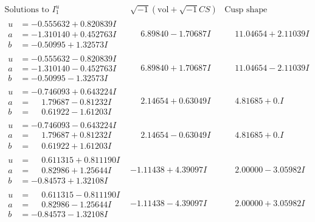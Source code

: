 \documentclass[1p]{elsarticle_modified}
\theoremstyle{definition}
\newcommand{\I}{\sqrt{-1}}
\begin{document}
$$\begin{array}{c|c|c}  
\text{Solutions to }I^u_{1}& \I (\text{vol} + \sqrt{-1}CS) & \text{Cusp shape}\\
 \hline 
\begin{aligned}
u &= -0.555632 + 0.820839 I \\
a &= -1.310140 + 0.452763 I \\
b &= -0.50995 + 1.32573 I\end{aligned}
 & \phantom{-}6.89840 - 1.70687 I & \phantom{-}11.04654 + 2.11039 I \\ \hline\begin{aligned}
u &= -0.555632 - 0.820839 I \\
a &= -1.310140 - 0.452763 I \\
b &= -0.50995 - 1.32573 I\end{aligned}
 & \phantom{-}6.89840 + 1.70687 I & \phantom{-}11.04654 - 2.11039 I \\ \hline\begin{aligned}
u &= -0.746093 + 0.643224 I \\
a &= \phantom{-}1.79687 - 0.81232 I \\
b &= \phantom{-}0.61922 - 1.61203 I\end{aligned}
 & \phantom{-}2.14654 + 0.63049 I & \phantom{-}4.81685 + 0. I\phantom{ +0.000000I} \\ \hline\begin{aligned}
u &= -0.746093 - 0.643224 I \\
a &= \phantom{-}1.79687 + 0.81232 I \\
b &= \phantom{-}0.61922 + 1.61203 I\end{aligned}
 & \phantom{-}2.14654 - 0.63049 I & \phantom{-}4.81685 + 0. I\phantom{ +0.000000I} \\ \hline\begin{aligned}
u &= \phantom{-}0.611315 + 0.811190 I \\
a &= \phantom{-}0.82986 + 1.25644 I \\
b &= -0.84573 + 1.32108 I\end{aligned}
 & -1.11438 + 4.39097 I & \phantom{-}2.00000 - 3.05982 I \\ \hline\begin{aligned}
u &= \phantom{-}0.611315 - 0.811190 I \\
a &= \phantom{-}0.82986 - 1.25644 I \\
b &= -0.84573 - 1.32108 I\end{aligned}
 & -1.11438 - 4.39097 I & \phantom{-}2.00000 + 3.05982 I \\ \hline\begin{aligned}

\end{aligned}
\end{array}$$
\end{document}
